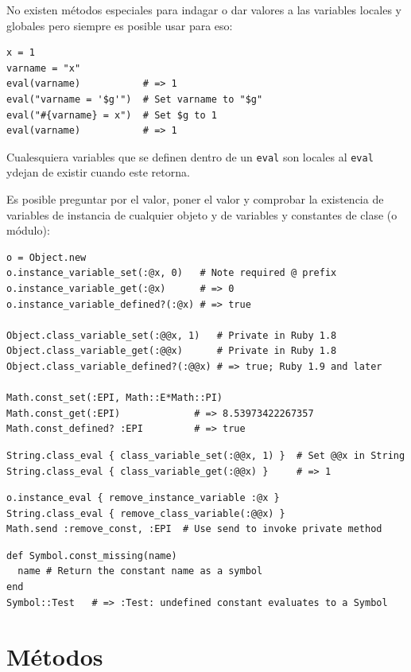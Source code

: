 No existen métodos especiales para indagar o dar valores a las variables
locales y globales pero siempre es posible usar  para eso:
\begin{verbatim}
x = 1
varname = "x"
eval(varname)           # => 1
eval("varname = '$g'")  # Set varname to "$g"
eval("#{varname} = x")  # Set $g to 1
eval(varname)           # => 1
\end{verbatim}
Cualesquiera variables que
se definen dentro de un \verb|eval| son locales al \verb|eval|
ydejan de existir cuando este retorna.

Es posible preguntar por el valor, poner el valor y comprobar la existencia
de variables de instancia de cualquier objeto y de variables y constantes de 
clase (o módulo):
\begin{verbatim}
o = Object.new
o.instance_variable_set(:@x, 0)   # Note required @ prefix
o.instance_variable_get(:@x)      # => 0
o.instance_variable_defined?(:@x) # => true

Object.class_variable_set(:@@x, 1)   # Private in Ruby 1.8
Object.class_variable_get(:@@x)      # Private in Ruby 1.8
Object.class_variable_defined?(:@@x) # => true; Ruby 1.9 and later

Math.const_set(:EPI, Math::E*Math::PI)
Math.const_get(:EPI)             # => 8.53973422267357
Math.const_defined? :EPI         # => true 
\end{verbatim}

\begin{verbatim}
String.class_eval { class_variable_set(:@@x, 1) }  # Set @@x in String
String.class_eval { class_variable_get(:@@x) }     # => 1
\end{verbatim}

\begin{verbatim}
o.instance_eval { remove_instance_variable :@x }
String.class_eval { remove_class_variable(:@@x) }
Math.send :remove_const, :EPI  # Use send to invoke private method
\end{verbatim}

\begin{verbatim}
def Symbol.const_missing(name)
  name # Return the constant name as a symbol
end
Symbol::Test   # => :Test: undefined constant evaluates to a Symbol
\end{verbatim}

\section{Métodos}


